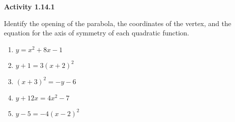 \noindent\textbf{Activity 1.14.1}


Identify the opening of the parabola, the coordinates of the vertex, and the equation for the axis of symmetry of each quadratic function. 
\begin{multicols}{2}
\begin{enumerate}[label = \color{blue}\arabic*. ]
\item $ y = x^{2} + 8x - 1 $
\item $ y + 1 = 3(x + 2)^{2} $
\item $ (x + 3)^{2} = -y - 6 $
\item $ y + 12x = 4x^{2} - 7 $
\item $ y - 5 = -4(x - 2)^{2} $
\end{enumerate}
\end{multicols} 
